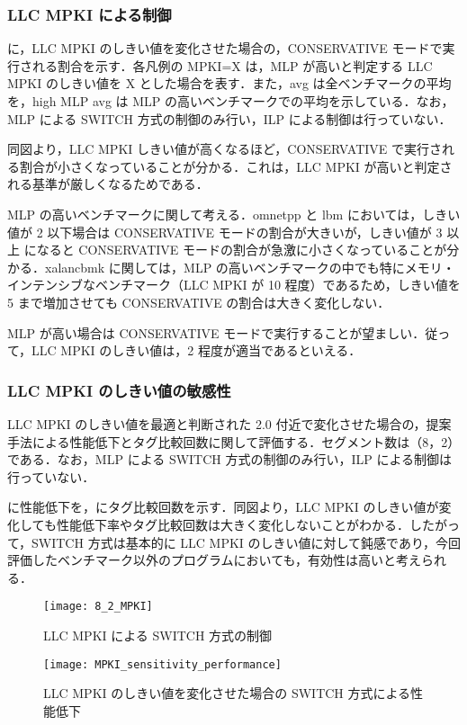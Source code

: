 \subsubsection{LLC MPKI による制御}
に，LLC MPKI のしきい値を変化させた場合の，CONSERVATIVE モードで実行される割合を示す．各凡例の MPKI=X は，MLP が高いと判定する LLC MPKI のしきい値を X とした場合を表す．また，avg は全ベンチマークの平均を，high MLP avg は MLP の高いベンチマークでの平均を示している．なお，MLP による SWITCH 方式の制御のみ行い，ILP による制御は行っていない．


同図より，LLC MPKI しきい値が高くなるほど，CONSERVATIVE で実行される割合が小さくなっていることが分かる．これは，LLC MPKI が高いと判定される基準が厳しくなるためである．

MLP の高いベンチマークに関して考える．omnetpp と lbm においては，しきい値が 2 以下場合は CONSERVATIVE モードの割合が大きいが，しきい値が 3 以上 になると CONSERVATIVE モードの割合が急激に小さくなっていることが分かる．xalancbmk に関しては，MLP の高いベンチマークの中でも特にメモリ・インテンシブなベンチマーク（LLC MPKI が 10 程度）であるため，しきい値を 5 まで増加させても CONSERVATIVE の割合は大きく変化しない．

MLP が高い場合は CONSERVATIVE モードで実行することが望ましい．従って，LLC MPKI のしきい値は，2 程度が適当であるといえる．

\subsubsection{LLC MPKI のしきい値の敏感性}
LLC MPKI のしきい値を最適と判断された 2.0 付近で変化させた場合の，提案手法による性能低下とタグ比較回数に関して評価する．セグメント数は（8，2）である．なお，MLP による SWITCH 方式の制御のみ行い，ILP による制御は行っていない．

に性能低下を，にタグ比較回数を示す．同図より，LLC MPKI のしきい値が変化しても性能低下率やタグ比較回数は大きく変化しないことがわかる．したがって，SWITCH 方式は基本的に LLC MPKI のしきい値に対して鈍感であり，今回評価したベンチマーク以外のプログラムにおいても，有効性は高いと考えられる．

\begin{figure}[htb]
  \centering
  \texttt{[image: 8\_2\_MPKI]}
  \caption{LLC MPKI による SWITCH 方式の制御}
  \label{fig:switch_MPKI_rate}
\end{figure}

  \begin{figure}[htb]
  \centering
  \texttt{[image: MPKI\_sensitivity\_performance]}
  \caption{LLC MPKI のしきい値を変化させた場合の SWITCH 方式による性能低下}
  \label{fig:MPKI_sensitivity_performance}
\end{figure}

